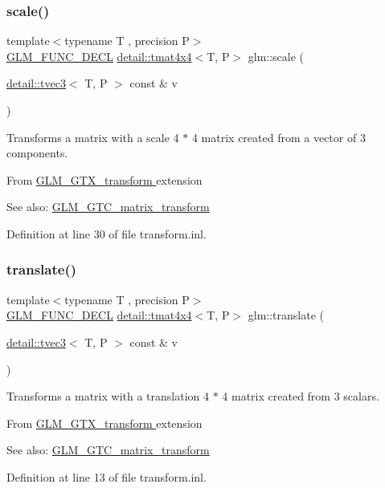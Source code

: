 \subsubsection{\texorpdfstring{scale()}{scale()}}
{\footnotesize\ttfamily template$<$typename T , precision P$>$ \\
\hyperlink{setup_8hpp_ab2d052de21a70539923e9bcbf6e83a51}{G\+L\+M\+\_\+\+F\+U\+N\+C\+\_\+\+D\+E\+CL} \hyperlink{structglm_1_1detail_1_1tmat4x4}{detail\+::tmat4x4}$<$T, P$>$ glm\+::scale (\begin{DoxyParamCaption}\item[{\hyperlink{structglm_1_1detail_1_1tvec3}{detail\+::tvec3}$<$ T, P $>$ const \&}]{v }\end{DoxyParamCaption})}

Transforms a matrix with a scale 4 $\ast$ 4 matrix created from a vector of 3 components.
\begin{DoxyItemize}
\item From \hyperlink{group__gtx__transform}{G\+L\+M\+\_\+\+G\+T\+X\+\_\+transform } extension
\item See also\+: \hyperlink{group__gtc__matrix__transform_gabd40959f269abd16c256a4f59ab03d62}{G\+L\+M\+\_\+\+G\+T\+C\+\_\+matrix\+\_\+transform } 
\end{DoxyItemize}

Definition at line 30 of file transform.\+inl.

\mbox{\label{group__gtx__transform_ga8a2efce0917bf301cc0ea7afb428f688}} 
\subsubsection{\texorpdfstring{translate()}{translate()}}
{\footnotesize\ttfamily template$<$typename T , precision P$>$ \\
\hyperlink{setup_8hpp_ab2d052de21a70539923e9bcbf6e83a51}{G\+L\+M\+\_\+\+F\+U\+N\+C\+\_\+\+D\+E\+CL} \hyperlink{structglm_1_1detail_1_1tmat4x4}{detail\+::tmat4x4}$<$T, P$>$ glm\+::translate (\begin{DoxyParamCaption}\item[{\hyperlink{structglm_1_1detail_1_1tvec3}{detail\+::tvec3}$<$ T, P $>$ const \&}]{v }\end{DoxyParamCaption})}

Transforms a matrix with a translation 4 $\ast$ 4 matrix created from 3 scalars.
\begin{DoxyItemize}
\item From \hyperlink{group__gtx__transform}{G\+L\+M\+\_\+\+G\+T\+X\+\_\+transform } extension
\item See also\+: \hyperlink{group__gtc__matrix__transform_ga1501de0fa580dcc491b67e0685bbc7c2}{G\+L\+M\+\_\+\+G\+T\+C\+\_\+matrix\+\_\+transform } 
\end{DoxyItemize}

Definition at line 13 of file transform.\+inl.

